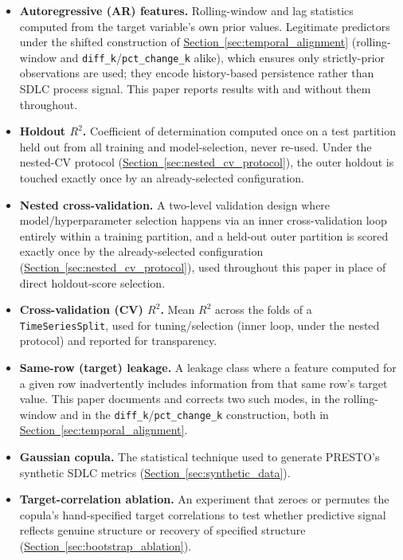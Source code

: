 \documentclass[technologies,article,submit,pdftex,moreauthors]{Definitions/mdpi}
\providecommand{\tightlist}{%
  \setlength{\itemsep}{0pt}\setlength{\parskip}{0pt}}
\begin{document}
\begin{itemize}
\tightlist
\item
  \textbf{Autoregressive (AR) features.} Rolling-window and lag statistics computed from the target variable's own prior values. Legitimate predictors under the shifted construction of \hyperref[sec:temporal_alignment]{Section~\ref*{sec:temporal_alignment}} (rolling-window and \texttt{diff\_k}/\texttt{pct\_change\_k} alike), which ensures only strictly-prior observations are used; they encode history-based persistence rather than SDLC process signal. This paper reports results with and without them throughout.
\item
  \textbf{Holdout \(R^2\).} Coefficient of determination computed once on a test partition held out from all training and model-selection, never re-used. Under the nested-CV protocol (\hyperref[sec:nested_cv_protocol]{Section~\ref*{sec:nested_cv_protocol}}), the outer holdout is touched exactly once by an already-selected configuration.
\item
  \textbf{Nested cross-validation.} A two-level validation design where model/hyperparameter selection happens via an inner cross-validation loop entirely within a training partition, and a held-out outer partition is scored exactly once by the already-selected configuration (\hyperref[sec:nested_cv_protocol]{Section~\ref*{sec:nested_cv_protocol}}), used throughout this paper in place of direct holdout-score selection.
\item
  \textbf{Cross-validation (CV) \(R^2\).} Mean \(R^2\) across the folds of a \texttt{TimeSeriesSplit}, used for tuning/selection (inner loop, under the nested protocol) and reported for transparency.
\item
  \textbf{Same-row (target) leakage.} A leakage class where a feature computed for a given row inadvertently includes information from that same row's target value. This paper documents and corrects two such modes, in the rolling-window and in the \texttt{diff\_k}/\texttt{pct\_change\_k} construction, both in \hyperref[sec:temporal_alignment]{Section~\ref*{sec:temporal_alignment}}.
\item
  \textbf{Gaussian copula.} The statistical technique used to generate PRESTO's synthetic SDLC metrics (\hyperref[sec:synthetic_data]{Section~\ref*{sec:synthetic_data}}).
\item
  \textbf{Target-correlation ablation.} An experiment that zeroes or permutes the copula's hand-specified target correlations to test whether predictive signal reflects genuine structure or recovery of specified structure (\hyperref[sec:bootstrap_ablation]{Section~\ref*{sec:bootstrap_ablation}}).

\end{itemize}
\end{document}
